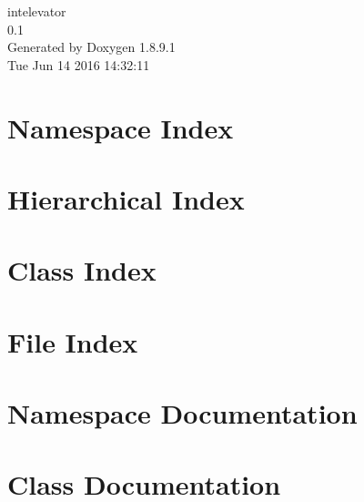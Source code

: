 \documentclass[twoside]{book}
\newcommand{\+}{\discretionary{\mbox{\scriptsize$\hookleftarrow$}}{}{}}
\newcommand{\clearemptydoublepage}{%
  \newpage{\pagestyle{empty}\cleardoublepage}%
}
\begin{document}
\begin{titlepage}
\vspace*{7cm}
\begin{center}%
{\Large intelevator \\[1ex]\large 0.\+1 }\\
\vspace*{1cm}
{\large Generated by Doxygen 1.8.9.1}\\
\vspace*{0.5cm}
{\small Tue Jun 14 2016 14:32:11}\\
\end{center}
\end{titlepage}
\clearemptydoublepage
\tableofcontents
\clearemptydoublepage
{}

\chapter{Namespace Index}

\chapter{Hierarchical Index}

\chapter{Class Index}

\chapter{File Index}

\chapter{Namespace Documentation}


\chapter{Class Documentation}




































\end{document}
